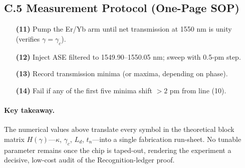 \documentclass[11pt]{article}
\begin{document}
\vspace{0.6em}
\subsection*{C.5  Measurement Protocol (One-Page SOP)}
\begin{enumerate}
\item[\textbf{(11)}] Pump the Er/Yb arm until net transmission at 1550 nm is unity (verifies $\gamma=\gamma_c$).  
\item[\textbf{(12)}] Inject ASE filtered to 1549.90–1550.05 nm; sweep with 0.5-pm step.  
\item[\textbf{(13)}] Record transmission minima (or maxima, depending on phase).  
\item[\textbf{(14)}] Fail if any of the first five minima shift $>\!2$ pm from line (10).
\end{enumerate}

\vspace{0.8em}
\paragraph{Key takeaway.}  
The numerical values above translate every symbol in the theoretical
block matrix $H(\gamma)$—$\kappa$, $\gamma_c$, $L_d$, $t_n$—into a
single fabrication run-sheet.  
No tunable parameter remains once the chip is taped-out, rendering the
experiment a decisive, low-cost audit of the Recognition-ledger proof.
\end{document}
